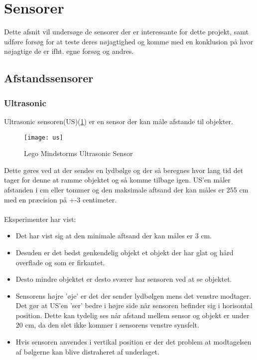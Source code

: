 \section{Sensorer}
Dette afsnit vil undersøge de sensorer der er interessante for dette projekt, samt udføre forsøg for at teste deres nøjagtighed og komme med en konklusion på hvor nøjagtige de er ifht. egne forsøg og andres.

\subsection{Afstandssensorer}
\subsubsection{Ultrasonic}
Ultrasonic sensoren(US)(\ref{sensor:ultrasonic_sensor}) er en sensor der kan måle afstande til objekter.

\begin{figure}[h]
\centering
\texttt{[image: us]}
\caption{Lego Mindstorms Ultrasonic Sensor}
\label{sensor:ultrasonic_sensor}
\end{figure}

Dette gøres ved at der sendes en lydbølge og der så beregnes hvor lang tid det tager for denne at ramme objektet og så komme tilbage igen.
US'en måler afstanden i cm eller tommer og den maksimale aftsand der kan måles er 255 cm med en præcision på +-3 centimeter.\cite{tikNXT}
\\
\\
Eksperimenter\cite{tikNXT} har vist:
\begin{itemize}
\item Det har vist sig at den minimale aftsand der kan måles er 3 cm.
\item Desuden er det bedst genkendelig objekt et objekt der har glat og hård overflade og som er firkantet.
\item Desto mindre objektet er desto sværer har sensoren ved at se objektet.
\item Sensorens højre 'øje' er det der sender lydbølgen mens det venstre modtager.
Det gør at US'en 'ser' bedre i højre side når sensoren befinder sig i horisontal position.
Dette kan tydelig ses når afstand mellem sensor og objekt er under 20 cm, da den slet ikke kommer i sensorens venstre synsfelt.
\item Hvis sensoren anvendes i vertikal position er der det problem at modtagelsen af bølgerne kan blive distraheret af underlaget.
\end{itemize}

